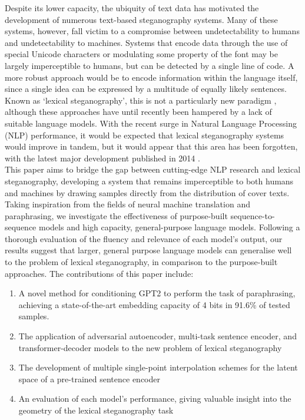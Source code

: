 \documentclass[12pt,a4paper]{article}
\begin{document}
    \indent Despite its lower capacity, the ubiquity of text data has motivated the development of numerous text-based steganography systems. Many of these systems, however, fall victim to a compromise between undetectability to humans and undetectability to machines. Systems that encode data through the use of special Unicode characters \cite{zwj} or modulating some property of the font \cite{font} may be largely imperceptible to humans, but can be detected by a single line of code. A more robust approach would be to encode information within the language itself, since a single idea can be expressed by a multitude of equally likely sentences. Known as `lexical steganography', this is not a particularly new paradigm \cite{tlex}, although these approaches have until recently been hampered by a lack of suitable language models. With the recent surge in Natural Language Processing (NLP) performance, it would be expected that lexical steganography systems would improve in tandem, but it would appear that this area has been forgotten, with the latest major development published in 2014 \cite{covertweet1}.\\
    \indent This paper aims to bridge the gap between cutting-edge NLP research and lexical steganography, developing a system that remains imperceptible to both humans and machines by drawing samples directly from the distribution of cover texts. Taking inspiration from the fields of neural machine translation and paraphrasing, we investigate the effectiveness of purpose-built sequence-to-sequence models and high capacity, general-purpose language models. Following a thorough evaluation of the fluency and relevance of each model's output, our results suggest that larger, general purpose language models can generalise well to the problem of lexical steganography, in comparison to the purpose-built approaches. The contributions of this paper include:
    \begin{enumerate}
  \setlength{\itemsep}{0pt}
  \setlength{\parskip}{0pt}
      \item A novel method for conditioning GPT2 to perform the task of paraphrasing, achieving a state-of-the-art embedding capacity of 4 bits in 91.6\% of tested samples.
      \item The application of adversarial autoencoder, multi-task sentence encoder, and transformer-decoder models to the new problem of lexical steganography
      \item The development of multiple single-point interpolation schemes for the latent space of a pre-trained sentence encoder
      \item An evaluation of each model's performance, giving valuable insight into the geometry of the lexical steganography task
    \end{enumerate}
\end{document}
